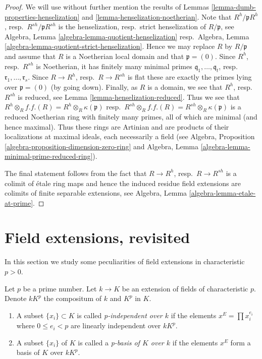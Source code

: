 \begin{proof}
We will use without further mention the results of
Lemmas \ref{lemma-dumb-properties-henselization} and
\ref{lemma-henselization-noetherian}.
Note that $R^h/\mathfrak pR^h$, resp.\ $R^{sh}/\mathfrak pR^{sh}$
is the henselization, resp.\ strict henselization of $R/\mathfrak p$,
see Algebra, Lemma \ref{algebra-lemma-quotient-henselization}
resp.\ Algebra, Lemma \ref{algebra-lemma-quotient-strict-henselization}.
Hence we may replace $R$ by $R/\mathfrak p$ and assume that $R$
is a Noetherian local domain and that $\mathfrak p = (0)$.
Since $R^h$, resp.\ $R^{sh}$ is Noetherian, it has finitely many
minimal primes $\mathfrak q_1, \ldots, \mathfrak q_t$,
resp.\ $\mathfrak r_1, \ldots, \mathfrak r_s$.
Since $R \to R^h$, resp.\ $R \to R^{sh}$ is flat these are exactly
the primes lying over $\mathfrak p = (0)$ (by going down).
Finally, as $R$ is a domain, we see that $R^h$, resp.\ $R^{sh}$
is reduced, see Lemma \ref{lemma-henselization-reduced}.
Thus we see that $R^h \otimes_R f.f.(R) = R^h \otimes_R \kappa(\mathfrak p)$
resp.\ $R^{sh} \otimes_R f.f.(R) = R^{sh} \otimes_R \kappa(\mathfrak p)$
is a reduced Noetherian ring with finitely many primes, all of which
are minimal (and hence maximal). Thus these rings are Artinian and are
products of their localizations at maximal ideals, each necessarily a field
(see Algebra, Proposition \ref{algebra-proposition-dimension-zero-ring} and
Algebra, Lemma \ref{algebra-lemma-minimal-prime-reduced-ring}).

\medskip\noindent
The final statement follows from the fact that $R \to R^h$,
resp.\ $R \to R^{sh}$ is a colimit of \'etale ring maps and hence
the induced residue field extensions are colimits of finite separable
extensions, see
Algebra, Lemma \ref{algebra-lemma-etale-at-prime}.
\end{proof}









\section{Field extensions, revisited}
\label{section-p-bases}

\noindent
In this section we study some peculiarities of field extensions in
characteristic $p > 0$.

\begin{definition}
\label{definition-p-basis}
Let $p$ be a prime number. Let $k \to K$ be an extension of fields
of characteristic $p$. Denote $kK^p$ the compositum of $k$ and $K^p$
in $K$.
\begin{enumerate}
\item A subset $\{x_i\} \subset K$ is called {\it p-independent
over $k$} if the elements $x^E = \prod x_i^{e_i}$ where
$0 \leq e_i < p$ are linearly independent over $kK^p$.
\item A subset $\{x_i\}$ of $K$ is called a
{\it p-basis of $K$ over $k$} if the elements
$x^E$ form a basis of $K$ over $kK^p$.
\end{enumerate}
\end{definition}


